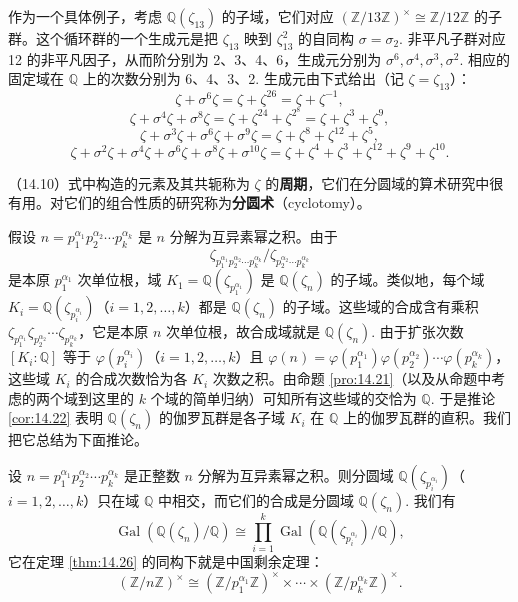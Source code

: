 \begin{example}
作为一个具体例子，考虑 \(\mathbb{Q}(\zeta_{13})\) 的子域，它们对应 \((\mathbb{Z}/13\mathbb{Z})^\times \cong \mathbb{Z}/12\mathbb{Z}\) 的子群。这个循环群的一个生成元是把 \(\zeta_{13}\) 映到 \(\zeta_{13}^2\) 的自同构 \(\sigma = \sigma_2\). 非平凡子群对应 12 的非平凡因子，从而阶分别为 2、3、4、6，生成元分别为 \(\sigma^6, \sigma^4, \sigma^3, \sigma^2\). 相应的固定域在 \(\mathbb{Q}\) 上的次数分别为 6、4、3、2. 生成元由下式给出（记 \(\zeta = \zeta_{13}\)）：
\[
\zeta+\sigma^6\zeta = \zeta+\zeta^{26} = \zeta+\zeta^{-1},
\]
\[
\zeta+\sigma^4\zeta+\sigma^8\zeta = \zeta+\zeta^{24}+\zeta^{2^8} = \zeta+\zeta^3+\zeta^9,
\]
\[
\zeta+\sigma^3\zeta+\sigma^6\zeta+\sigma^9\zeta = \zeta+\zeta^8+\zeta^{12}+\zeta^5,
\]
\[
\zeta+\sigma^2\zeta+\sigma^4\zeta+\sigma^6\zeta+\sigma^8\zeta+\sigma^{10}\zeta = \zeta+\zeta^4+\zeta^3+\zeta^{12}+\zeta^9+\zeta^{10}.
\]

（14.10）式中构造的元素及其共轭称为 \(\zeta\) 的\textbf{周期}，它们在分圆域的算术研究中很有用。对它们的组合性质的研究称为\textbf{分圆术}（cyclotomy）。
\end{example}

假设 \(n = p_1^{\alpha_1}p_2^{\alpha_2}\cdots p_k^{\alpha_k}\) 是 \(n\) 分解为互异素幂之积。由于
\[
\zeta_{p_1^{\alpha_1}p_2^{\alpha_2}\cdots p_k^{\alpha_k}}/\zeta_{p_2^{\alpha_2}\cdots p_k^{\alpha_k}}
\]
是本原 \(p_1^{\alpha_1}\) 次单位根，域 \(K_1 = \mathbb{Q}(\zeta_{p_1^{\alpha_1}})\) 是 \(\mathbb{Q}(\zeta_n)\) 的子域。类似地，每个域 \(K_i = \mathbb{Q}(\zeta_{p_i^{\alpha_i}})\)（\(i = 1, 2, \ldots, k\)）都是 \(\mathbb{Q}(\zeta_n)\) 的子域。这些域的合成含有乘积 \(\zeta_{p_1^{\alpha_1}}\zeta_{p_2^{\alpha_2}}\cdots\zeta_{p_k^{\alpha_k}}\)，它是本原 \(n\) 次单位根，故合成域就是 \(\mathbb{Q}(\zeta_n)\). 由于扩张次数 \([K_i:\mathbb{Q}]\) 等于 \(\varphi(p_i^{\alpha_i})\)（\(i = 1, 2, \ldots, k\)）且 \(\varphi(n) = \varphi(p_1^{\alpha_1})\varphi(p_2^{\alpha_2})\cdots\varphi(p_k^{\alpha_k})\)，这些域 \(K_i\) 的合成次数恰为各 \(K_i\) 次数之积。由命题 \ref{pro:14.21}（以及从命题中考虑的两个域到这里的 \(k\) 个域的简单归纳）可知所有这些域的交恰为 \(\mathbb{Q}\). 于是推论 \ref{cor:14.22} 表明 \(\mathbb{Q}(\zeta_n)\) 的伽罗瓦群是各子域 \(K_i\) 在 \(\mathbb{Q}\) 上的伽罗瓦群的直积。我们把它总结为下面推论。

\begin{corollary}\label{cor:14.27}
设 \(n = p_1^{\alpha_1}p_2^{\alpha_2}\cdots p_k^{\alpha_k}\) 是正整数 \(n\) 分解为互异素幂之积。则分圆域 \(\mathbb{Q}(\zeta_{p_i^{\alpha_i}})\)（\(i = 1, 2, \ldots, k\)）只在域 \(\mathbb{Q}\) 中相交，而它们的合成是分圆域 \(\mathbb{Q}(\zeta_n)\). 我们有
\[
\operatorname{Gal}(\mathbb{Q}(\zeta_n)/\mathbb{Q}) \cong \prod_{i=1}^k\operatorname{Gal}(\mathbb{Q}(\zeta_{p_i^{\alpha_i}})/\mathbb{Q}),
\]
它在定理 \ref{thm:14.26} 的同构下就是中国剩余定理：
\[
(\mathbb{Z}/n\mathbb{Z})^\times \cong (\mathbb{Z}/p_1^{\alpha_1}\mathbb{Z})^\times \times \cdots \times (\mathbb{Z}/p_k^{\alpha_k}\mathbb{Z})^\times.
\]
\end{corollary}

